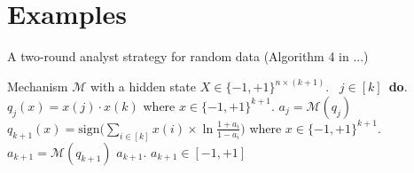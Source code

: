 
\section{Examples}


\begin{algorithm}
\caption{A two-round analyst strategy for random data (Algorithm 4 in ...)}
\label{alg:BitGOF}
\begin{algorithmic}
\REQUIRE Mechanism $\mathcal{M}$ with a hidden state $X\in \{-1,+1\}^{n\times (k+1)}$.
\ $j\in [k]$\ {\bf do}.  
\STATE {} $q_j(x)=x(j)\cdot x(k)$ where $x\in \{-1,+1\}^{k+1}$.
\STATE {} $a_j=\mathcal{M}(q_j)$ 
\STATE \qquad {}
 $q_{k+1}(x)=\mathrm{sign}\big (\sum_{i\in [k]} x(i)\times\ln\frac{1+a_i}{1-a_i} \big )$ where $x\in \{-1,+1\}^{k+1}$.
\STATE{}
 $a_{k+1}=\mathcal{M}(q_{k+1})$
\STATE{}
\RETURN $a_{k+1}$.
\ENSURE $a_{k+1}\in [-1,+1]$
\end{algorithmic}
\end{algorithm}





\newpage

